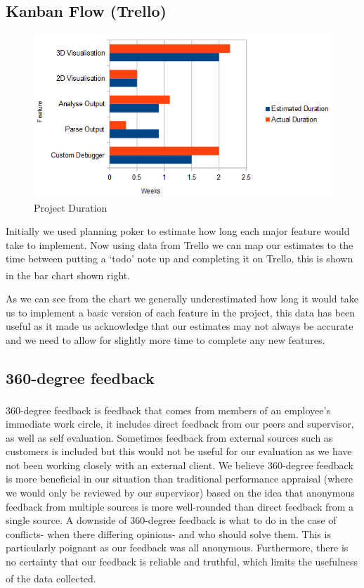 \documentclass[10pt, a4paper]{article}
\begin{document}
\subsection{Kanban Flow (Trello)}

\begin{figure}
        \centering
        \includegraphics[scale=0.5]{images/evaluation/duration.png}
        \caption{Project Duration}
\end{figure}

Initially we used  planning poker to estimate how long each major feature would take to implement. Now using data from Trello we can map our estimates to the time between putting a ‘todo’ note up and completing it on Trello, this is shown in the bar chart shown right\textsuperscript{\cite{kan}}.

As we can see from the chart we generally underestimated how long it would take us to implement a basic version of each feature in the project, this data has been useful as it made us acknowledge that our estimates may not always be accurate and we need to allow for slightly more time to complete any new features.

\subsection{360-degree feedback}

360-degree feedback\textsuperscript{\cite{jj}} is feedback that comes from members of an employee's immediate work circle, it includes direct feedback from our peers and supervisor, as well as self evaluation. Sometimes feedback from external sources such as customers is included but this would not be useful for our evaluation as we have not been working closely with an external client. We believe 360-degree feedback is more beneficial in our situation than traditional performance appraisal (where we would only be reviewed by our supervisor) based on the idea that anonymous feedback from multiple sources is more well-rounded than direct feedback from a single source. A downside of 360-degree feedback is what to do in the case of conflicts- when there differing opinions- and who should solve them. This is particularly poignant as our feedback was all anonymous. Furthermore, there is no certainty that our feedback is reliable and truthful, which limits the usefulness of the data collected\textsuperscript{\cite{360}}.
\end{document}
